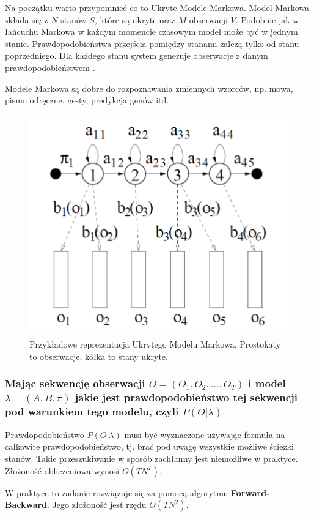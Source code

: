 \documentclass[wi]{zut}
\begin{document}
Na początku warto przypomnieć co to Ukryte Modele Markowa. Model Markowa składa się z $N$ stanów $S$, które są ukryte oraz $M$ obserwacji $V$. Podobnie jak w łańcuchu Markowa w każdym momencie czasowym model może być w jednym stanie. Prawdopodobieństwa przejścia pomiędzy stanami zależą tylko od stanu poprzedniego. Dla każdego stanu system generuje obserwacje z danym prawdopodobieństwem \cite{Pietrzykowski2020}. 

Modele Markowa są dobre do rozpoznawania zmiennych wzorców, np. mowa, pismo odręczne, gesty, predykcja genów itd.\cite{Pietrzykowski2020}

\begin{figure}[H]
    \centering
    \includegraphics[width=0.5\linewidth]{images/hidden_markov.png}
    \caption{Przykładowe reprezentacja Ukrytego Modelu Markowa. Prostokąty to obserwacje, kółka to stany ukryte.}
    \label{fig:pdgd}
\end{figure}

\subsubsection{Mając sekwencję obserwacji $O = (O_1, O_2, \ldots, O_T)$ i model $\lambda = (A, B, \pi)$ jakie jest prawdopodobieństwo tej sekwencji pod warunkiem tego modelu, czyli $P(O|\lambda)$}

Prawdopodobieństwo $P(O|\lambda)$ musi być wyznaczone używając formuła na całkowite prawdopodobieństwo, tj. brać pod uwagę wszystkie możliwe ścieżki stanów. Takie przeszukiwanie w sposób zachłanny jest niemożliwe w praktyce. Złożoność obliczeniowa wynosi $O(TN^T)$\cite{Pietrzykowski2020}. 

W praktyce to zadanie rozwiązuje się za pomocą algorytmu \textbf{Forward-Backward}. Jego złożoność jest rzędu $O(TN^2)$\cite{Pietrzykowski2020}.
\end{document}
